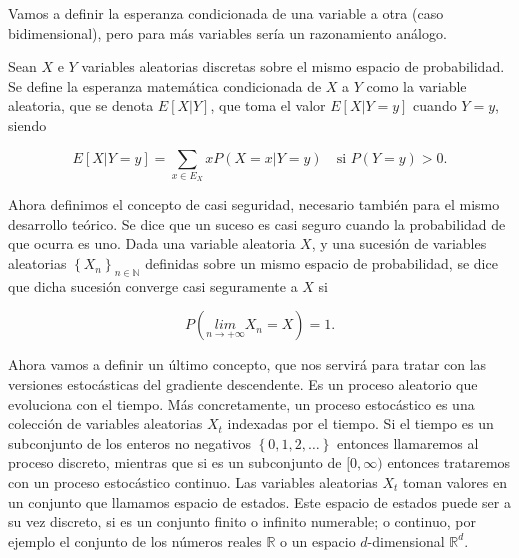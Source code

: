 Vamos a definir la esperanza condicionada de una variable a otra (caso bidimensional), pero para más variables sería un razonamiento análogo.

\begin{definicion}
	Sean $X$ e $Y$ variables aleatorias discretas sobre el mismo espacio de probabilidad. Se define la esperanza matemática condicionada de $X$ a $Y$ como la variable aleatoria, que se denota $E[X|Y]$, que toma el valor $E[X|Y=y]$ cuando $Y=y$, siendo 

\begin{equation}
	E[X|Y=y] = \sum_{x \in E_X} xP(X=x | Y=y) \quad \text{si } P(Y=y)>0.
\end{equation}
\end{definicion}

Ahora definimos el concepto de casi seguridad, necesario también para el mismo desarrollo teórico. Se dice que un suceso es casi seguro cuando la probabilidad de que ocurra es uno. Dada una variable aleatoria $X$, y una sucesión de variables aleatorias $\left \{ X_n \right \} _{n \in \mathbb{N}}$ definidas sobre un mismo espacio de probabilidad, se dice que dicha sucesión converge casi seguramente a $X$ si 

\begin{equation*}
	P \left ( \underset{n \rightarrow + \infty}{lim} X_n =X \right ) =1.
\end{equation*}

Ahora vamos a definir un último concepto, que nos servirá para tratar con las versiones estocásticas del gradiente descendente. Es un proceso aleatorio que evoluciona con el tiempo. Más concretamente, un proceso estocástico es una colección de variables aleatorias $X_t$ indexadas por el tiempo. Si el tiempo es un subconjunto de los enteros no negativos $\left \{ 0,1,2, \ldots \right \}$ entonces llamaremos al proceso discreto, mientras que si es un subconjunto de $[0, \infty )$ entonces trataremos con un proceso estocástico continuo. Las variables aleatorias $X_t$ toman valores en un conjunto que llamamos espacio de estados. Este espacio de estados puede ser a su vez discreto, si es un conjunto finito o infinito numerable; o continuo, por ejemplo el conjunto de los números reales $\mathbb{R}$ o un espacio $d$-dimensional $\mathbb{R}^d$.
